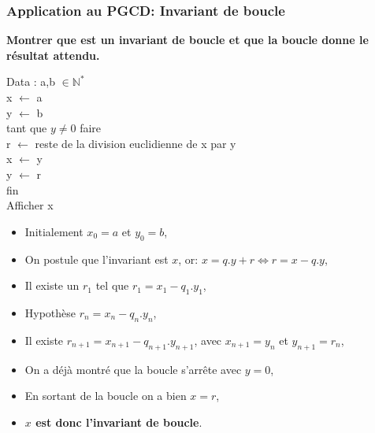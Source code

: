 \begin{frame}[fragile]
\frametitle{Application au PGCD: Invariant de boucle}

\textbf{Montrer que  est un invariant de boucle et que la boucle donne le résultat attendu.}

\begin{minipage}{0.4\linewidth}
Data : a,b $\in \mathbb{N}^*$\\
x $\leftarrow$ a \\
y $\leftarrow$ b \\
tant que $y\neq0$ faire \\
\hspace*{0.5cm} r $\leftarrow$ reste de la division euclidienne de x par y \\
\hspace*{0.5cm} x $\leftarrow$ y \\
\hspace*{0.5cm} y $\leftarrow$ r \\
fin \\
Afficher x
\end{minipage}\hfill
\begin{minipage}{0.56\linewidth}
\begin{itemize}
 \item Initialement $x_0=a$ et $y_0=b$,
 \item On postule que l'invariant est $x$, or: $x=q.y+r \Leftrightarrow r=x-q.y$,
 \item Il existe un $r_1$ tel que $r_1=x_1-q_1.y_1$,
 \item Hypothèse $r_n=x_n-q_n.y_n$,
 \item Il existe $r_{n+1}=x_{n+1}-q_{n+1}.y_{n+1}$, avec $x_{n+1}=y_n$ et $y_{n+1}=r_n$,
 \item On a déjà montré que la boucle s'arrête avec $y=0$,
 \item En sortant de la boucle on a bien $x=r$,
 \item \textbf{$x$ est donc l'invariant de boucle}.
\end{itemize}

\end{minipage}

\vspace{2cm}

\end{frame}


